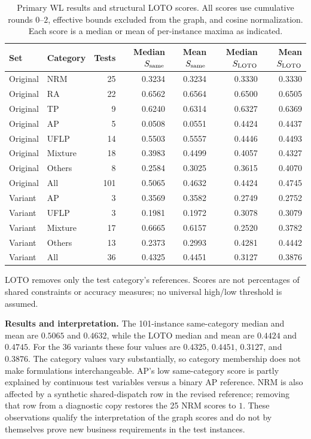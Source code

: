 \begin{table}[H]
\centering\scriptsize
\caption{Primary WL results and structural LOTO scores. All scores use
cumulative rounds $0$--$2$, effective bounds excluded from the graph, and
cosine normalization. Each score is a median or mean of per-instance
maxima as indicated.}
\label{tab:ae-wl-compact-results}
\setlength{\tabcolsep}{4.5pt}
\begin{tabular}{@{}llrrrrr@{}}
\toprule
Set & Category & Tests & Median $S_{\rm same}$ & Mean $S_{\rm same}$ &
Median $S_{\rm LOTO}$ & Mean $S_{\rm LOTO}$\\
\midrule
Original & NRM     & 25 & 0.3234 & 0.3234 & 0.3330 & 0.3330\\
Original & RA      & 22 & 0.6562 & 0.6564 & 0.6500 & 0.6505\\
Original & TP      & 9  & 0.6240 & 0.6314 & 0.6327 & 0.6369\\
Original & AP      & 5  & 0.0508 & 0.0551 & 0.4424 & 0.4437\\
Original & UFLP    & 14 & 0.5503 & 0.5557 & 0.4446 & 0.4493\\
Original & Mixture & 18 & 0.3983 & 0.4499 & 0.4057 & 0.4327\\
Original & Others  & 8  & 0.2584 & 0.3025 & 0.3615 & 0.4070\\
\midrule
Original & All     & 101& 0.5065 & 0.4632 & 0.4424 & 0.4745\\
\midrule
Variant & AP      & 3  & 0.3569 & 0.3582 & 0.2749 & 0.2752\\
Variant & UFLP    & 3  & 0.1981 & 0.1972 & 0.3078 & 0.3079\\
Variant & Mixture & 17 & 0.6665 & 0.6157 & 0.2520 & 0.3782\\
Variant & Others  & 13 & 0.2373 & 0.2993 & 0.4281 & 0.4442\\
\midrule
Variant & All     & 36 & 0.4325 & 0.4451 & 0.3127 & 0.3876\\
\bottomrule
\end{tabular}
\par\vspace{3pt}
\parbox{\linewidth}{\footnotesize
LOTO removes only the test category's references. Scores are not
percentages of shared constraints or accuracy measures; no universal
high/low threshold is assumed.}
\end{table}

\medskip
\textbf{Results and interpretation.}
The 101-instance same-category median and mean are $0.5065$ and
$0.4632$, while the LOTO median and mean are $0.4424$ and $0.4745$.
For the 36 variants these four values are $0.4325$, $0.4451$, $0.3127$,
and $0.3876$.
The category values vary substantially, so category membership does not
make formulations interchangeable. AP's low same-category score is
partly explained by continuous test variables versus a binary AP
reference. NRM is also affected by a synthetic shared-dispatch row in
the revised reference; removing that row from a diagnostic copy restores
the 25 NRM scores to $1$. These observations qualify the interpretation
of the graph scores and do not by themselves prove new business
requirements in the test instances.


